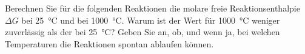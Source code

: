 \documentclass[ahaeffekt]{exercise}
\begin{document}
Berechnen Sie für die folgenden Reaktionen die molare freie Reaktionsenthalpie $\Delta G$ bei \SI{25}{\celsius} und bei \SI{1000}{\celsius}. Warum ist der Wert für \SI{1000}{\celsius} weniger zuverlässig als der bei \SI{25}{\celsius}? Geben Sie an, ob, und wenn ja, bei welchen Temperaturen die Reaktionen spontan ablaufen können.
\begin{alphlist}
 \item {}
 \item {}
 \item {}
 \item {}
 \item {}
 \item {}
\end{alphlist}
\end{document}
